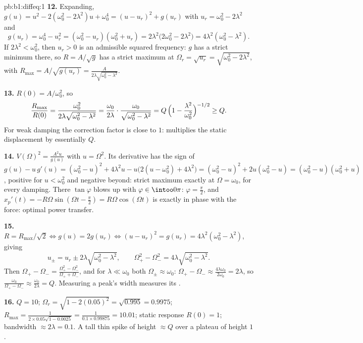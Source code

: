 \begin{solution}{pb:b1:diffeq:1}
\textbf{12.} Expanding, $g(u) = u^2 - 2(\omega_0^2 - 2\lambda^2)u
+ \omega_0^4 = (u - u_r)^2 + g(u_r)$ with $u_r = \omega_0^2 -
2\lambda^2$ and
\[
g(u_r) = \omega_0^4 - u_r^2 = (\omega_0^2 - u_r)(\omega_0^2 +
u_r) = 2\lambda^2\bigl(2\omega_0^2 - 2\lambda^2\bigr) =
4\lambda^2(\omega_0^2 - \lambda^2) .
\]
If $2\lambda^2 < \omega_0^2$, then $u_r > 0$ is an admissible
squared frequency: $g$ has a strict minimum there, so $R = A/\sqrt
g$ has a strict maximum at $\Omega_r = \sqrt{u_r} =
\sqrt{\omega_0^2 - 2\lambda^2}$, with $R_{\max} = A/\sqrt{g(u_r)}
= \frac{A}{2\lambda\sqrt{\omega_0^2 - \lambda^2}}$.

\textbf{13.} $R(0) = A/\omega_0^2$, so
\[
\frac{R_{\max}}{R(0)}
= \frac{\omega_0^2}{2\lambda\sqrt{\omega_0^2 - \lambda^2}}
= \frac{\omega_0}{2\lambda}\cdot
\frac{\omega_0}{\sqrt{\omega_0^2 - \lambda^2}}
= Q\,\Bigl(1 - \frac{\lambda^2}{\omega_0^2}\Bigr)^{-1/2}
\geq Q .
\]
For weak damping the correction factor is close to $1$: 
multiplies the static displacement by essentially $Q$.

\textbf{14.} $V(\Omega)^2 = \frac{A^2 u}{g(u)}$ with $u =
\Omega^2$. Its derivative has the sign of $g(u) - u\,g'(u) =
(\omega_0^2 - u)^2 + 4\lambda^2 u - u\bigl(2(u - \omega_0^2) +
4\lambda^2\bigr) = (\omega_0^2 - u)^2 + 2u(\omega_0^2 - u) =
(\omega_0^2 - u)(\omega_0^2 + u)$, positive for $u < \omega_0^2$
and negative beyond: strict maximum exactly at $\Omega =
\omega_0$, for every damping. There $\tan\varphi$ blows up with
$\varphi \in \intoo0\pi$: $\varphi = \frac\pi2$, and $x_p'(t) =
-R\Omega\sin(\Omega t - \frac\pi2) = R\Omega\cos(\Omega t)$ is
exactly in phase with the force: optimal power transfer.

\textbf{15.} $R = R_{\max}/\sqrt2 \iff g(u) = 2g(u_r) \iff (u -
u_r)^2 = g(u_r) = 4\lambda^2(\omega_0^2 - \lambda^2)$, giving
\[
u_\pm = u_r \pm 2\lambda\sqrt{\omega_0^2 - \lambda^2},
\qquad
\Omega_+^2 - \Omega_-^2 = 4\lambda\sqrt{\omega_0^2 - \lambda^2} .
\]
Then $\Omega_+ - \Omega_- = \frac{\Omega_+^2 -
\Omega_-^2}{\Omega_+ + \Omega_-}$, and for $\lambda \ll \omega_0$
both $\Omega_\pm \approx \omega_0$: $\Omega_+ - \Omega_- \approx
\frac{4\lambda\omega_0}{2\omega_0} = 2\lambda$, so
$\frac{\omega_0}{\Omega_+ - \Omega_-} \approx
\frac{\omega_0}{2\lambda} = Q$. Measuring a  peak's width
measures its .

\textbf{16.} $Q = 10$; $\Omega_r = \sqrt{1 - 2(0.05)^2} =
\sqrt{0.995} = 0.9975$; $R_{\max} = \frac1{2 \times 0.05
\sqrt{1 - 0.0025}} = \frac1{0.1 \times 0.99875} = 10.01$; static
response $R(0) = 1$; bandwidth $\approx 2\lambda = 0.1$. A tall
thin spike of height $\approx Q$ over a plateau of height $1$.


\end{solution}
